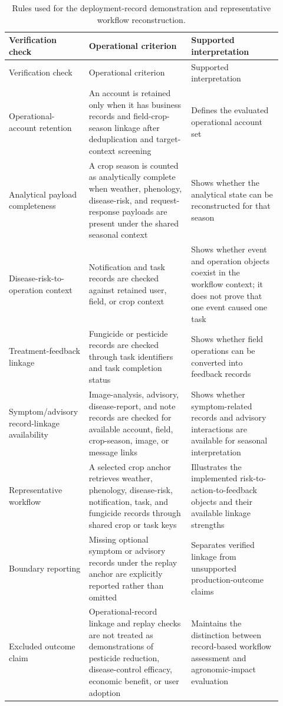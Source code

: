 \documentclass[12pt]{article}
\begin{document}
\begingroup
\setlength{\tabcolsep}{3pt}
\renewcommand{\arraystretch}{1.12}
\begin{longtable}{@{}L{0.24\linewidth} L{0.36\linewidth} L{0.32\linewidth}@{}}
\caption{Rules used for the deployment-record demonstration and representative workflow reconstruction.}\label{tab:supp_verification_rules}\\
\toprule
Verification check & Operational criterion & Supported interpretation \\
\midrule
\endfirsthead
\toprule
Verification check & Operational criterion & Supported interpretation \\
\midrule
\endhead
Operational-account retention & An account is retained only when it has business records and field-crop-season linkage after deduplication and target-context screening & Defines the evaluated operational account set \\
Analytical payload completeness & A crop season is counted as analytically complete when weather, phenology, disease-risk, and request-response payloads are present under the shared seasonal context & Shows whether the analytical state can be reconstructed for that season \\
Disease-risk-to-operation context & Notification and task records are checked against retained user, field, or crop context & Shows whether event and operation objects coexist in the workflow context; it does not prove that one event caused one task \\
Treatment-feedback linkage & Fungicide or pesticide records are checked through task identifiers and task completion status & Shows whether field operations can be converted into feedback records \\
Symptom/advisory record-linkage availability & Image-analysis, advisory, disease-report, and note records are checked for available account, field, crop-season, image, or message links & Shows whether symptom-related records and advisory interactions are available for seasonal interpretation \\
Representative workflow & A selected crop anchor retrieves weather, phenology, disease-risk, notification, task, and fungicide records through shared crop or task keys & Illustrates the implemented risk-to-action-to-feedback objects and their available linkage strengths \\
Boundary reporting & Missing optional symptom or advisory records under the replay anchor are explicitly reported rather than omitted & Separates verified linkage from unsupported production-outcome claims \\
Excluded outcome claim & Operational-record linkage and replay checks are not treated as demonstrations of pesticide reduction, disease-control efficacy, economic benefit, or user adoption & Maintains the distinction between record-based workflow assessment and agronomic-impact evaluation \\
\bottomrule
\end{longtable}
\endgroup
\end{document}
